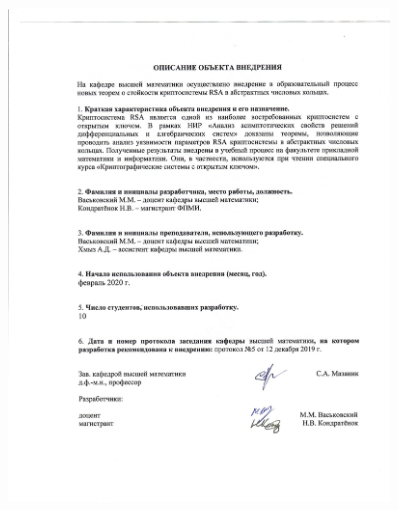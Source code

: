 \documentclass[_00_dissertation.tex]{subfiles}
\begin{document}
\begin{figure}[ht!]
    \centering
    \includegraphics[width=0.9\textwidth]{../additional/Act_KondratyonokNV_page-0002.jpg}
\end{figure}

\onlyinsubfile{
    
}
\end{document}
